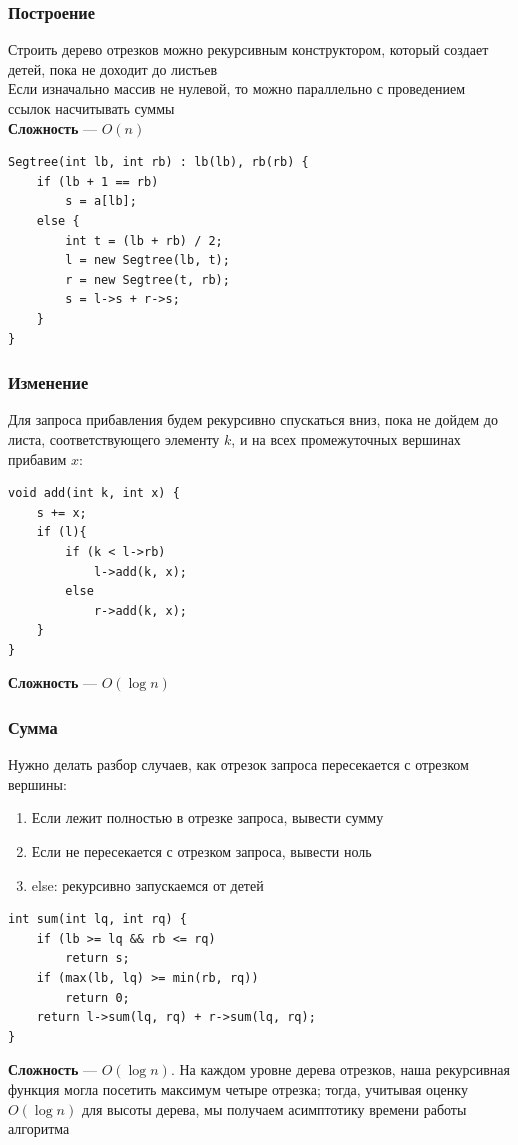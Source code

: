 \documentclass[a4paper]{article}
\begin{document}
\subsubsection{Построение}
Строить дерево отрезков можно рекурсивным конструктором, который создает детей, пока не доходит до листьев\\[2mm]
\indent Если изначально массив не нулевой, то можно параллельно с проведением ссылок насчитывать суммы\\[2mm]
\indent \textbf{Сложность} — $O(n)$
\begin{lstlisting}
Segtree(int lb, int rb) : lb(lb), rb(rb) {
    if (lb + 1 == rb)
        s = a[lb];
    else {
        int t = (lb + rb) / 2;
        l = new Segtree(lb, t);
        r = new Segtree(t, rb);
        s = l->s + r->s;
    }
}
\end{lstlisting}

\subsubsection{Изменение}
Для запроса прибавления будем рекурсивно спускаться вниз, пока не дойдем до листа, соответствующего элементу $k$, и на всех промежуточных вершинах прибавим $x$:
\begin{lstlisting}
void add(int k, int x) {
    s += x;
    if (l){
        if (k < l->rb)
            l->add(k, x);
        else
            r->add(k, x);
    }
}
\end{lstlisting}
\indent \textbf{Сложность} — $O(\log n)$

\subsubsection{Сумма}
Нужно делать разбор случаев, как отрезок запроса пересекается с отрезком вершины:
\begin{enumerate}
    \item Если лежит полностью в отрезке запроса, вывести сумму
    \item Если не пересекается с отрезком запроса, вывести ноль
    \item else: рекурсивно запускаемся от детей
\end{enumerate}
\begin{lstlisting}
int sum(int lq, int rq) {
    if (lb >= lq && rb <= rq)
        return s;
    if (max(lb, lq) >= min(rb, rq))
        return 0;
    return l->sum(lq, rq) + r->sum(lq, rq);
}
\end{lstlisting}
\indent \textbf{Сложность} — $O(\log n)$. На каждом уровне дерева отрезков, наша рекурсивная функция могла посетить максимум четыре отрезка; тогда, учитывая оценку $O (\log n)$ для высоты дерева, мы получаем асимптотику времени работы алгоритма
\end{document}
